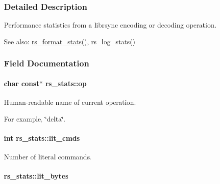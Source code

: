 \subsubsection{Detailed Description}
Performance statistics from a librsync encoding or decoding operation. 

\begin{Desc}
\item[See also:]\hyperlink{librsync_8h_cca80c2890032283d93dc7abf02aec6f}{rs\_\-format\_\-stats()}, rs\_\-log\_\-stats() \end{Desc}


\subsubsection{Field Documentation}
\hypertarget{structrs__stats_7bea565f5d1687eb6b953b518034d43c}{
\paragraph[op]{\setlength{\rightskip}{0pt plus 5cm}char const$\ast$ {\bf rs\_\-stats::op}}\hfill}
\label{structrs__stats_7bea565f5d1687eb6b953b518034d43c}


Human-readable name of current operation. 

For example, \char`\"{}delta\char`\"{}. \hypertarget{structrs__stats_0126775feaafac1539f519ac56346713}{
\paragraph[lit\_\-cmds]{\setlength{\rightskip}{0pt plus 5cm}int {\bf rs\_\-stats::lit\_\-cmds}}\hfill}
\label{structrs__stats_0126775feaafac1539f519ac56346713}


Number of literal commands. 

\hypertarget{structrs__stats_f21a0846d6bafd18f6f592862808fac4}{
\paragraph[lit\_\-bytes]{ {\bf rs\_\-stats::lit\_\-bytes}}\hfill}
\label{structrs__stats_f21a0846d6bafd18f6f592862808fac4}


